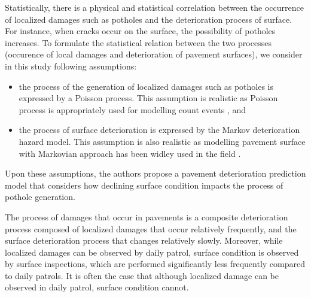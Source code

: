\documentclass[Journal]{ascelike}
\begin{document}
Statistically, there is a physical and statistical correlation between the occurrence of localized damages such as potholes and the deterioration process of surface. For instance, when cracks occur on the surface, the possibility of potholes increases. To formulate the statistical relation between the two processes (occurence of local damages and deterioration of pavement surfaces), we consider in this study following assumptions: 
\begin{itemize}
	\item the process of the generation of localized damages such as potholes is expressed by a Poisson process. This assumption is realistic as Poisson process is appropriately used for modelling count events \citep{Kingman1963}, and
	\item the process of surface deterioration is expressed by the Markov deterioration hazard model. This assumption is also realistic as modelling pavement surface with Markovian approach has been widley used in the field \citep{Madanat1993,Madanat1995,Kobayashi2011}. 
\end{itemize}
Upon these assumptions, the authors propose a pavement deterioration prediction model that considers how declining surface condition impacts the process of pothole generation.

The process of damages that occur in pavements is a composite deterioration process composed of localized damages that occur relatively frequently, and the surface deterioration process that changes relatively slowly. Moreover, while localized damages can be observed by daily patrol, surface condition is observed by surface inspections, which are performed significantly less frequently compared to daily patrols. It is often the case that although localized damage can be observed in daily patrol, surface condition cannot. 
\end{document}
